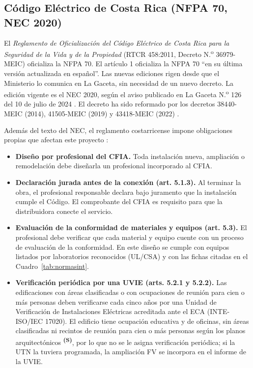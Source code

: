 \documentclass[12pt]{article}
\newcommand{\supuesto}{\textsuperscript{\textcolor{orange!80!black}{\textbf{(S)}}}}
\begin{document}
\subsection{Código Eléctrico de Costa Rica (NFPA 70, NEC 2020)}
El \emph{Reglamento de Oficialización del Código Eléctrico de Costa Rica para la Seguridad de la Vida y de la Propiedad} (RTCR 458:2011, Decreto N.\textsuperscript{o} 36979-MEIC) oficializa la NFPA 70. El artículo 1 oficializa la NFPA 70 ``en su última versión actualizada en español''. Las nuevas ediciones rigen desde que el Ministerio lo comunica en La Gaceta, sin necesidad de un nuevo decreto. La edición vigente es el NEC 2020, según el aviso publicado en La Gaceta N.\textsuperscript{o} 126 del 10 de julio de 2024 \cite{rtcr458,gacetaNEC}. El decreto ha sido reformado por los decretos 38440-MEIC (2014), 41505-MEIC (2019) y 43418-MEIC (2022) \cite{rtcr458}.

Además del texto del NEC, el reglamento costarricense impone obligaciones propias que afectan este proyecto \cite{rtcr458}:
\begin{itemize}
\item \textbf{Diseño por profesional del CFIA.} Toda instalación nueva, ampliación o remodelación debe diseñarla un profesional incorporado al CFIA.
\item \textbf{Declaración jurada antes de la conexión (art. 5.1.3).} Al terminar la obra, el profesional responsable declara bajo juramento que la instalación cumple el Código. El comprobante del CFIA es requisito para que la distribuidora conecte el servicio.
\item \textbf{Evaluación de la conformidad de materiales y equipos (art. 5.3).} El profesional debe verificar que cada material y equipo cuente con un proceso de evaluación de la conformidad. En este diseño se cumple con equipos listados por laboratorios reconocidos (UL/CSA) y con las fichas citadas en el Cuadro~\ref{tab:normasint}.
\item \textbf{Verificación periódica por una UVIE (arts. 5.2.1 y 5.2.2).} Las edificaciones con áreas clasificadas o con ocupaciones de reunión para cien o más personas deben verificarse cada cinco años por una Unidad de Verificación de Instalaciones Eléctricas acreditada ante el ECA (INTE-ISO/IEC 17020). El edificio tiene ocupación educativa y de oficinas, sin áreas clasificadas ni recintos de reunión para cien o más personas según los planos arquitectónicos \supuesto{}, por lo que no se le asigna verificación periódica; si la UTN la tuviera programada, la ampliación FV se incorpora en el informe de la UVIE.
\end{itemize}
\end{document}
